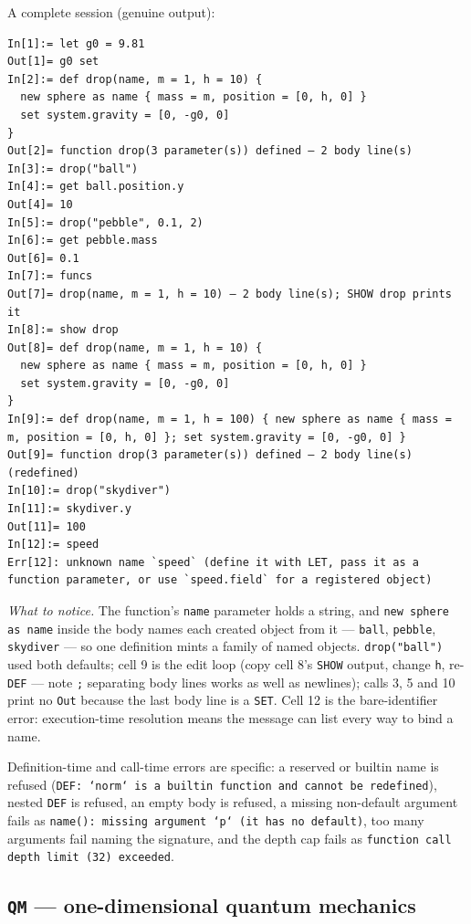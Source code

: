 \documentclass[11pt]{article}
\newcommand{\kw}[1]{\texttt{\uppercase{#1}}}
\newcommand{\code}[1]{\texttt{#1}}
\begin{document}
A complete session (genuine output):

\begin{lstlisting}
In[1]:= let g0 = 9.81
Out[1]= g0 set
In[2]:= def drop(name, m = 1, h = 10) {
  new sphere as name { mass = m, position = [0, h, 0] }
  set system.gravity = [0, -g0, 0]
}
Out[2]= function drop(3 parameter(s)) defined — 2 body line(s)
In[3]:= drop("ball")
In[4]:= get ball.position.y
Out[4]= 10
In[5]:= drop("pebble", 0.1, 2)
In[6]:= get pebble.mass
Out[6]= 0.1
In[7]:= funcs
Out[7]= drop(name, m = 1, h = 10) — 2 body line(s); SHOW drop prints it
In[8]:= show drop
Out[8]= def drop(name, m = 1, h = 10) {
  new sphere as name { mass = m, position = [0, h, 0] }
  set system.gravity = [0, -g0, 0]
}
In[9]:= def drop(name, m = 1, h = 100) { new sphere as name { mass = m, position = [0, h, 0] }; set system.gravity = [0, -g0, 0] }
Out[9]= function drop(3 parameter(s)) defined — 2 body line(s) (redefined)
In[10]:= drop("skydiver")
In[11]:= skydiver.y
Out[11]= 100
In[12]:= speed
Err[12]: unknown name `speed` (define it with LET, pass it as a function parameter, or use `speed.field` for a registered object)
\end{lstlisting}

\emph{What to notice.} The function's \code{name} parameter holds a
string, and \code{new sphere as name} inside the body names each
created object from it --- \code{ball}, \code{pebble},
\code{skydiver} --- so one definition mints a family of named
objects. \code{drop("ball")} used both defaults; cell 9 is the edit
loop (copy cell 8's \kw{show} output, change \code{h}, re-\kw{def}
--- note \code{;} separating body lines works as well as newlines);
calls 3, 5 and 10 print no \code{Out} because the last body line is a
\kw{set}. Cell 12 is the bare-identifier error: execution-time
resolution means the message can list every way to bind a name.

Definition-time and call-time errors are specific: a reserved or
builtin name is refused (\code{DEF: `norm` is a builtin function and
cannot be redefined}), nested \kw{def} is refused, an empty body is
refused, a missing non-default argument fails as
\code{name(): missing argument `p` (it has no default)}, too many
arguments fail naming the signature, and the depth cap fails as
\code{function call depth limit (32) exceeded}.

\subsection{\kw{qm} --- one-dimensional quantum mechanics}\label{sec:qm}
\end{document}
